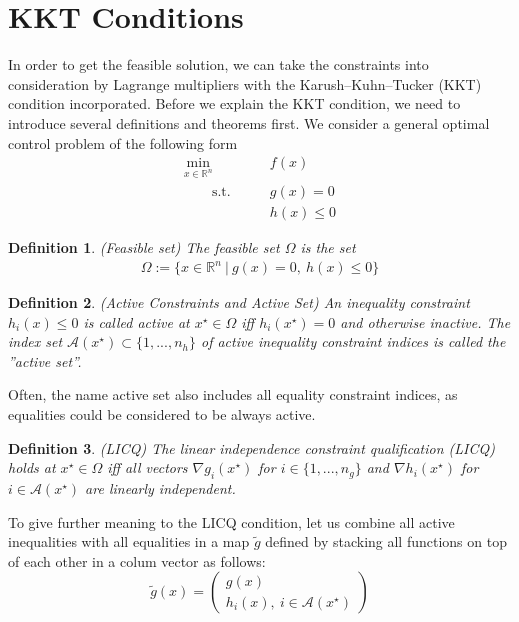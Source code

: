 \documentclass  [
  paper    = a4,
  BCOR     = 10mm,
  twoside,
  fontsize = 12pt,
  fleqn,
  toc      = bibnumbered,
  toc      = listofnumbered,
  numbers  = noendperiod,
  headings = normal,
  listof   = leveldown,
  version  = 3.03
]                                       {scrreprt}
\newcommand{\<}{\langle}
\renewcommand{\>}{\rangle}
\newtheorem{definition}{Definition}
\begin{document}
\section{KKT Conditions}
\label{Sec_KKT}
In order to get the feasible solution, we can take the constraints into consideration by Lagrange multipliers with the Karush–Kuhn–Tucker (KKT) condition incorporated. Before we explain the KKT condition, we need to introduce several definitions and theorems first. We consider a general optimal control problem of the following form
\begin{equation}
	\label{eq:OCP_discret_compact}
	\begin{aligned}
		\underset{x \in \mathbb{R}^n}{\text{min}} \qquad &f(x)	\\
		\qquad \text{s.t.}\qquad	&  g(x)	 = 0   \\
						                  &  h(x)	\leq 0 
	\end{aligned}
\end{equation}
\begin{definition}(Feasible set) The feasible set $\Omega$ is the set 
	\begin{align}
		\Omega:= \{x \in \mathbb{R}^n \ | \ g(x)= 0 , \ h(x)	\leq 0 \}	
	\end{align}
\end{definition}	
\begin{definition}(Active Constraints and Active Set) An inequality constraint $h_i(x) \leq 0$ is called active at $x^\star \in  \Omega$  iff  $h_i(x^\star) = 0$ and otherwise inactive. The index set $\mathcal{A}(x^\star) \subset \{1, ..., n_h\}$  of active inequality constraint indices is called the ”active set”.
\end{definition}
Often, the name active set also includes all equality constraint indices, as equalities could be considered to be always active. 
\begin{definition} (LICQ) The linear independence constraint qualification (LICQ) holds at $x^\star \in  \Omega $ iff all vectors $\nabla g_i(x^\star)$ for $i \in \{1, ..., n_g \}$ and $\nabla h_i(x^\star)$ for  $i \in \mathcal{A}(x^\star)$ are linearly independent.
	\label{df_LICO}
\end{definition}
To give further meaning to the LICQ condition, let us combine all active inequalities with all equalities in a map $\tilde{g}$ defined by stacking all functions on top of each other in a colum vector as follows:
\begin{equation}
	\tilde{g}(x) =  \begin{pmatrix} g(x) \\ h_i(x), \ i \in \mathcal{A}(x^\star)    \end{pmatrix}
\end{equation}
\end{document}
